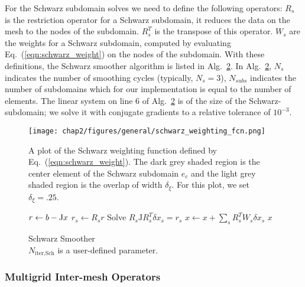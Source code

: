 %
For the Schwarz subdomain solves we
need to define the following operators: $R_s$ is the restriction
operator for a Schwarz subdomain, it reduces the data on the mesh to
the nodes of the subdomain. $R_s^T$ is the transpose of this
operator. $W_s$ are the weights for a Schwarz subdomain, computed by
evaluating Eq.~(\ref{eqn:schwarz_weight}) on the nodes of the
subdomain. With these definitions, the Schwarz smoother algorithm is
listed in Alg.~\ref{alg:schwarz_smoother}. In
Alg.~\ref{alg:schwarz_smoother}, $N_s$ indicates the number of
smoothing cycles (typically, $N_s=3$), $N_{subs}$ indicates the number of subdomains which for our implementation is equal to the number of elements. The linear
system on line 6 of Alg.~\ref{alg:schwarz_smoother} is of the size of the Schwarz-subdomain; we solve it with conjugate gradients to a relative tolerance of $10^{-3}$.

\begin{figure}
  \centering
  \texttt{[image: chap2/figures/general/schwarz\_weighting\_fcn.png]}
\caption{
  \label{fig:schwarz_weight}
  A plot of the Schwarz weighting function defined by Eq.~(\ref{eqn:schwarz_weight}). The dark grey shaded region is the center element of the Schwarz subdomain  $e_c$  and the light grey shaded region is the overlap of width $\delta_\xi$. For this plot, we set $\delta_\xi = .25$.
}
\end{figure}
%
\begin{figure}
  \begin{algorithm}[H]
    \caption{\label{alg:schwarz_smoother}
      Schwarz Smoother\\ $N_{\text{iter,Sch}}$ is a user-defined parameter.
    }
    \begin{algorithmic}[1]
      \State $r \leftarrow b - {\rm J}x$  %
      \State $r_s \leftarrow R_s r$
      \State Solve $R_s \mathrm{J} R^T_s \delta x_s = r_s$
      \EndFor
      \State $x \leftarrow x + \sum_{s}R_s^TW_s\delta x_s$
      \EndFor
      \State \Return $x$
      \EndFunction
    \end{algorithmic}
  \end{algorithm}
\end{figure}
%
%
\subsubsection{Multigrid Inter-mesh Operators}

